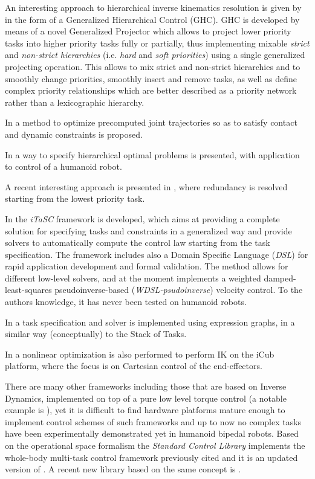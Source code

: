 An interesting approach to hierarchical inverse kinematics resolution is given by \cite{Liu2015-yq} in the form of a Generalized Hierarchical Control (GHC). GHC is developed by means of a novel Generalized Projector which allows to project lower priority tasks into higher priority tasks fully or partially, thus implementing mixable \emph{strict} and \emph{non-strict hierarchies} (i.e. \emph{hard} and \emph{soft priorities}) using a single generalized projecting operation. This allows to mix strict and non-strict hierarchies and to smoothly change priorities, smoothly insert and remove tasks, as well as define complex priority relationships which are better described as a priority network rather than a lexicographic hierarchy.

In \cite{Hauser2014-sq} a method to optimize precomputed joint trajectories so as to satisfy contact and dynamic constraints is proposed.

In \cite{Del_Prete2014-ph} a way to specify hierarchical optimal problems is presented, with application to control of a humanoid robot.

A recent interesting approach is presented in \cite{flacco14revprio}, where redundancy is resolved starting from the lowest priority task.

In \cite{De_Schutter2007-to,Decre2009-om,Decre2013-yt,Smits2009-nv,Vanthienen2012-ed,Vanthienen2013-pl} the \emph{iTaSC} framework is developed, which aims at providing a complete solution for specifying tasks and constraints in a generalized way and provide solvers to automatically compute the control law starting from the task specification. The framework includes also a Domain Specific Language (\emph{DSL}) for rapid application development and formal validation. The method allows for different low-level solvers, and at the moment implements a weighted damped-least-squares pseudoinverse-based (\emph{WDSL-psudoinverse}) velocity control. To the authors knowledge, it has never been tested on humanoid robots.

In \cite{Aertbelien2014-iv} a task specification and solver is implemented using expression graphs, in a similar way (conceptually) to the Stack of Tasks.

In \cite{Pattacini2010-gr} a nonlinear optimization is also performed to perform IK on the iCub platform, where the focus is on Cartesian control of the end-effectors.

There are many other frameworks including those that are based on Inverse Dynamics, implemented on top of a pure low level torque control (a notable example is \cite{Sentis2010-bq}), yet it is difficult to find hardware platforms mature enough to implement control schemes of such frameworks and up to now no complex tasks have been experimentally demonstrated yet in humanoid bipedal robots.
Based on the operational space formalism the \emph{Standard Control Library} \cite{Menon_undated-hv} implements the whole-body multi-task control framework previously cited and it is an updated version of \cite{Philippsen2011-mq}.
A recent new library based on the same concept is \cite{Fok2015-cn}. 

